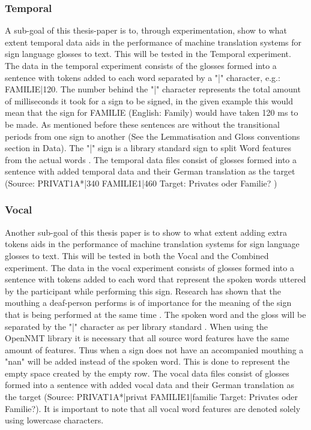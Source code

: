 \subsubsection{Temporal}

A sub-goal of this thesis-paper is to, through experimentation, show to what extent temporal data aids in the performance of machine translation systems for sign language glosses to text. This will be tested in the Temporal experiment. The data in the temporal experiment consists of the glosses formed into a sentence with tokens added to each word separated by a "|" character, e.g.: FAMILIE|120. The number behind the "|" character represents the total amount of milliseconds it took for a sign to be signed, in the given example this would mean that the sign for FAMILIE (English: Family) would have taken 120 ms to be made. As mentioned before these sentences are without the transitional periods from one sign to another (See the Lemmatisation and Gloss conventions section in Data). The "|" sign is a library standard sign to split Word features from the actual words \cite{klein-etal-2017-opennmt}. The temporal data files consist of glosses formed into a sentence with added temporal data and their German translation as the target (Source: PRIVAT1A*|340 FAMILIE1|460 Target: Privates oder Familie? \cite{dgscorpus_3})

\subsubsection{Vocal}

Another sub-goal of this thesis paper is to show to what extent adding extra tokens aids in the performance of machine translation systems for sign language glosses to text. This will be tested in both the Vocal and the Combined experiment. The data in the vocal experiment consists of glosses formed into a sentence with tokens added to each word that represent the spoken words uttered by the participant while performing this sign. Research has shown that the mouthing a deaf-person performs is of importance for the meaning of the sign that is being performed at the same time \cite{kristoffersen2016designing}. The spoken word and the gloss will be separated by the "|" character as per library standard \cite{klein-etal-2017-opennmt}. When using the OpenNMT library \cite{klein-etal-2017-opennmt} it is necessary that all source word features have the same amount of features. Thus when a sign does not have an accompanied mouthing a "nan" will be added instead of the spoken word. This is done to represent the empty space created by the empty row. The vocal data files consist of glosses formed into a sentence with added vocal data and their German translation as the target (Source: PRIVAT1A*|privat FAMILIE1|familie Target: Privates oder Familie?). It is important to note that all vocal word features are denoted solely using lowercase characters.

